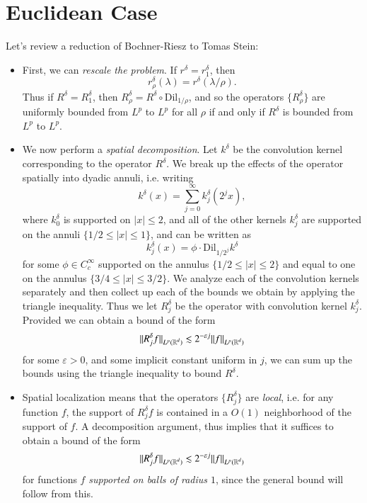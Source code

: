 \section{Euclidean Case}

Let's review a reduction of Bochner-Riesz to Tomas Stein:
%
\begin{itemize}
    \item First, we can \emph{rescale the problem}. If $r^\delta = r^\delta_1$, then
    \[ r_\rho^\delta(\lambda) = r^\delta(\lambda / \rho). \]
    Thus if $R^\delta = R^\delta_1$, then $R^\delta_\rho = R^\delta \circ \text{Dil}_{1/\rho}$, and so the operators $\{ R^\delta_\rho \}$ are uniformly bounded from $L^p$ to $L^p$ for all $\rho$ if and only if $R^\delta$ is bounded from $L^p$ to $L^p$.

    \item We now perform a \emph{spatial decomposition}. Let $k^\delta$ be the convolution kernel corresponding to the operator $R^\delta$. We break up the effects of the operator spatially into dyadic annuli, i.e. writing
    \[ k^\delta(x) = \sum_{j = 0}^\infty k^\delta_j(2^j x), \]
    where $k^\delta_0$ is supported on $|x| \leq 2$, and all of the other kernels $k^\delta_j$ are supported on the annuli $\{ 1/2 \leq |x| \leq 1 \}$, and can be written as
    \[ k^\delta_j(x) = \phi \cdot \text{Dil}_{1/2^j} k^\delta \]
    for some $\phi \in C_c^\infty$ supported on the annulus $\{ 1/2 \leq |x| \leq 2 \}$ and equal to one on the annulus $\{ 3/4 \leq |x| \leq 3/2 \}$. We analyze each of the convolution kernels separately and then collect up each of the bounds we obtain by applying the triangle inequality. Thus we let $R^\delta_j$ be the operator with convolution kernel $k^\delta_j$. Provided we can obtain a bound of the form
    \[ \| R^\delta_j f \|_{L^p(\operatorname{\mathbb{R}}^d)} \lesssim 2^{- \varepsilon j} \| f \|_{L^p(\operatorname{\mathbb{R}}^d)} \]
    for some $\varepsilon > 0$, and some implicit constant uniform in $j$, we can sum up the bounds using the triangle inequality to bound $R^\delta$.

    \item Spatial localization means that the operators $\{ R^\delta_j \}$ are \emph{local}, i.e. for any function $f$, the support of $R^\delta_j f$ is contained in a $O(1)$ neighborhood of the support of $f$. A decomposition argument, thus implies that it suffices to obtain a bound of the form
    \[ \| R^\delta_j f \|_{L^p(\operatorname{\mathbb{R}}^d)} \lesssim 2^{- \varepsilon j} \| f \|_{L^p(\operatorname{\mathbb{R}}^d)} \]
    for functions $f$ \emph{supported on balls of radius $1$}, since the general bound will follow from this.


\end{itemize}
